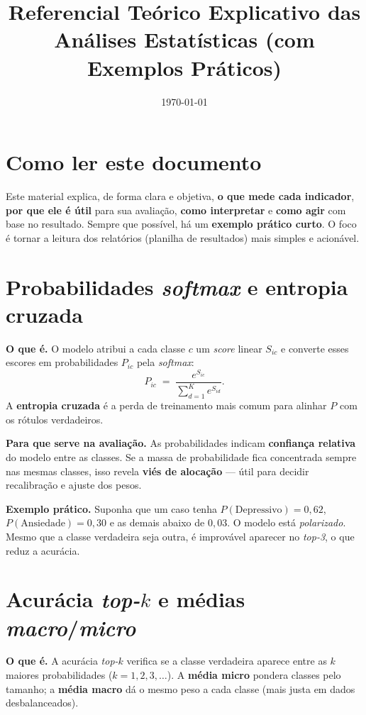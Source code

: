 \documentclass[12pt,a4paper]{article}
\title{Referencial Teórico Explicativo das Análises Estatísticas (com Exemplos Práticos)}
\author{}
\date{\today}
\begin{document}
\maketitle

\section*{Como ler este documento}
Este material explica, de forma clara e objetiva, \textbf{o que mede cada indicador}, \textbf{por que ele é útil} para sua avaliação, \textbf{como interpretar} e \textbf{como agir} com base no resultado. Sempre que possível, há um \textbf{exemplo prático curto}. O foco é tornar a leitura dos relatórios (planilha de resultados) mais simples e acionável.

\section{Probabilidades \textit{softmax} e entropia cruzada}
\textbf{O que é.} O modelo atribui a cada classe $c$ um \emph{score} linear $S_{ic}$ e converte esses escores em probabilidades $P_{ic}$ pela \textit{softmax}:
\begin{equation}
P_{ic} \;=\; \frac{e^{S_{ic}}}{\sum_{d=1}^{K} e^{S_{id}}}.
\end{equation}
A \textbf{entropia cruzada} é a perda de treinamento mais comum para alinhar $P$ com os rótulos verdadeiros.

\textbf{Para que serve na avaliação.} As probabilidades indicam \textbf{confiança relativa} do modelo entre as classes. Se a massa de probabilidade fica concentrada sempre nas mesmas classes, isso revela \textbf{viés de alocação} --- útil para decidir recalibração e ajuste dos pesos.

\textbf{Exemplo prático.} Suponha que um caso tenha $P(\text{Depressivo})=0{,}62$, $P(\text{Ansiedade})=0{,}30$ e as demais abaixo de $0{,}03$. O modelo está \emph{polarizado}. Mesmo que a classe verdadeira seja outra, é improvável aparecer no \emph{top-3}, o que reduz a acurácia.

\section{Acurácia \emph{top-$k$} e médias \emph{macro}/\emph{micro}}
\textbf{O que é.} A acurácia \emph{top-$k$} verifica se a classe verdadeira aparece entre as $k$ maiores probabilidades ($k=1,2,3,\dots$). A \textbf{média micro} pondera classes pelo tamanho; a \textbf{média macro} dá o mesmo peso a cada classe (mais justa em dados desbalanceados).
\end{document}
